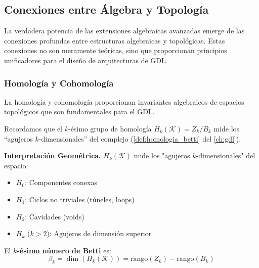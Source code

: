 \subsection{Conexiones entre Álgebra y Topología}

La verdadera potencia de las extensiones algebraicas avanzadas emerge de las conexiones profundas entre estructuras algebraicas y topológicas. Estas conexiones no son meramente teóricas, sino que proporcionan principios unificadores para el diseño de arquitecturas de \gls{GDL}.

\subsubsection{Homología y Cohomología}

La homología y cohomología proporcionan invariantes algebraicos de espacios topológicos que son fundamentales para el \gls{GDL}.

Recordamos que el $k$-ésimo grupo de homología $H_k(\mathcal{K}) = Z_k / B_k$ mide los ``agujeros $k$-dimensionales'' del complejo (\autoref{def:homologia_betti} del \autoref{ch:gdl}).\label{def:grupos_homologia_cnn}

\textbf{Interpretación Geométrica.}\label{rem:interp_homologia} $H_k(\mathcal{K})$ mide los "agujeros $k$-dimensionales" del espacio:
\begin{itemize}
    \item $H_0$: Componentes conexas
    \item $H_1$: Ciclos no triviales (túneles, loops)
    \item $H_2$: Cavidades (voids)
    \item $H_k$ ($k > 2$): Agujeros de dimensión superior
\end{itemize}

\begin{definition}\label{def:numeros_betti_cnn}
El \textbf{$k$-ésimo número de Betti} es:
\[\beta_k = \dim(H_k(\mathcal{K})) = \text{rango}(Z_k) - \text{rango}(B_k)\]
\end{definition}

